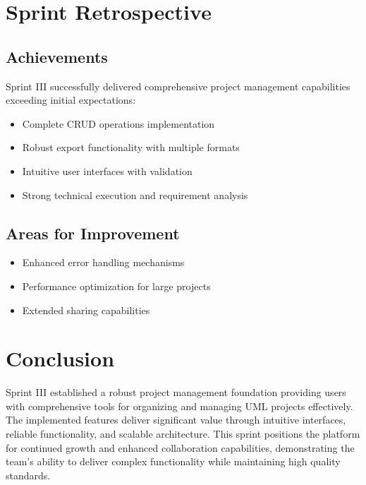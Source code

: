 \section{Sprint Retrospective}

\subsection{Achievements}
Sprint III successfully delivered comprehensive project management capabilities exceeding initial expectations:
\begin{itemize}
    \item Complete CRUD operations implementation
    \item Robust export functionality with multiple formats
    \item Intuitive user interfaces with validation
    \item Strong technical execution and requirement analysis
\end{itemize}

\subsection{Areas for Improvement}
\begin{itemize}
    \item Enhanced error handling mechanisms
    \item Performance optimization for large projects
    \item Extended sharing capabilities
\end{itemize}

\section{Conclusion}

Sprint III established a robust project management foundation providing users with comprehensive tools for organizing and managing UML projects effectively. The implemented features deliver significant value through intuitive interfaces, reliable functionality, and scalable architecture. This sprint positions the platform for continued growth and enhanced collaboration capabilities, demonstrating the team's ability to deliver complex functionality while maintaining high quality standards.